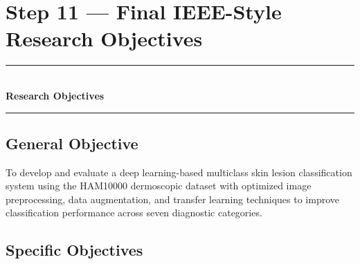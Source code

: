 \documentclass[11pt,a4paper]{article}
\begin{document}
\newpage

\section{Step 11 --- Final IEEE-Style Research Objectives}
\label{sec:step11}

\begin{center}
\textcolor{navyblue}{\rule{0.8\textwidth}{1.5pt}}\\[0.3cm]
{\LARGE\bfseries\color{navyblue} Research Objectives}\\[0.2cm]
\textcolor{navyblue}{\rule{0.8\textwidth}{1.5pt}}
\end{center}

\subsection*{General Objective}

\begin{objectivebox}
To develop and evaluate a deep learning-based multiclass skin lesion classification system using the HAM10000 dermoscopic dataset with optimized image preprocessing, data augmentation, and transfer learning techniques to improve classification performance across seven diagnostic categories.
\end{objectivebox}

\subsection*{Specific Objectives}
\end{document}
